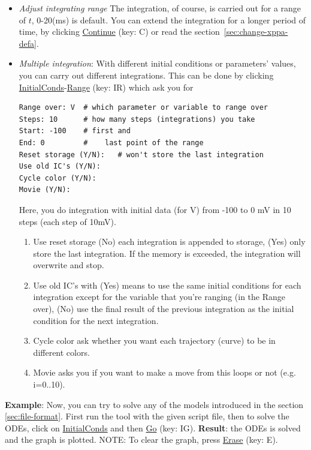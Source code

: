 \begin{itemize}
\item {\it Adjust integrating range} The integration, of course, is
  carried out for a range of $t$, 0-20(ms) is default. You can extend
  the integration for a longer period of time, by clicking
  \underline{Continue} (key: C) or read the
  section~\ref{sec:change-xppa-defa}.


\item {\it Multiple integration}: With different initial conditions or
  parameters' values, you can carry out different integrations. This
  can be done by clicking \underline{InitialConds}-\underline{Range}
  (key: IR) which ask you for
\begin{verbatim}
Range over: V  # which parameter or variable to range over
Steps: 10      # how many steps (integrations) you take
Start: -100    # first and
End: 0         #    last point of the range
Reset storage (Y/N):   # won't store the last integration
Use old IC's (Y/N):
Cycle color (Y/N):
Movie (Y/N):
\end{verbatim}
  Here, you do integration with initial data (for V) from -100 to 0 mV
  in 10 steps (each step of 10mV).
  \begin{enumerate}
  \item Use reset storage (No) each integration is appended to
    storage, (Yes) only store the last integration. If the memory is
    exceeded, the integration will overwrite and stop.
  \item Use old IC's with (Yes) means to use the same initial
    conditions for each integration except for the variable that
    you're ranging (in the Range over), (No) use the final result of
    the previous integration as the initial condition for the next
    integration.
  \item Cycle color ask whether you want each trajectory (curve) to be
    in different colors.
  \item Movie asks you if you want to make a move from this loops or
    not (e.g. i=0..10).
  \end{enumerate}
\end{itemize}


{\bf Example}: Now, you can try to solve any of the models introduced
in the section \ref{sec:file-format}. First run the tool with the
given script file, then to solve the ODEs, click on
\underline{InitialConds} and then \underline{Go} (key: IG).
{\bf Result}: the ODEs is solved and the graph is plotted.  NOTE: To
clear the graph, press \underline{Erase} (key: E).

